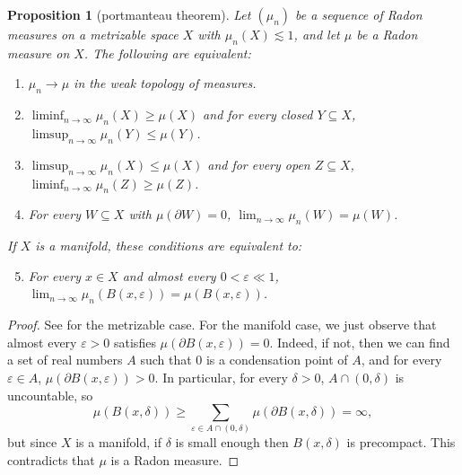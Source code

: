 \documentclass[reqno,11pt]{amsart}
\newtheorem{proposition}[theorem]{Proposition}
\theoremstyle{definition}
\numberwithin{equation}{section}
\begin{document}
\begin{proposition}[portmanteau theorem]
	Let $(\mu_n)$ be a sequence of Radon measures on a metrizable space $X$ with $\mu_n(X) \lesssim 1$, and let $\mu$ be a Radon measure on $X$. The following are equivalent:
\begin{enumerate}
	\item $\mu_n \to \mu$ in the weak topology of measures.
	\item $\liminf_{n \to \infty} \mu_n(X) \geq \mu(X)$ and for every closed $Y \subseteq X$, $\limsup_{n \to \infty} \mu_n(Y) \leq \mu(Y)$.
	\item $\limsup_{n \to \infty} \mu_n(X) \leq \mu(X)$ and for every open $Z \subseteq X$, $\liminf_{n \to \infty} \mu_n(Z) \geq \mu(Z)$.
	\item For every $W \subseteq X$ with $\mu(\partial W) = 0$, $\lim_{n \to \infty} \mu_n(W) = \mu(W)$.
\end{enumerate}
	If $X$ is a manifold, these conditions are equivalent to:
\begin{enumerate}
	\setcounter{enumi}{4}
	\item For every $x \in X$ and almost every $0 < \varepsilon \ll 1$, $\lim_{n \to \infty} \mu_n(B(x, \varepsilon)) = \mu(B(x, \varepsilon))$.
\end{enumerate}
\end{proposition}
\begin{proof}
	See \cite[Theorem 13.16]{klenke2013probability} for the metrizable case.
	For the manifold case, we just observe that almost every $\varepsilon > 0$ satisfies $\mu(\partial B(x, \varepsilon)) = 0$. Indeed, if not, then we can find a set of real numbers $A$ such that $0$ is a condensation point of $A$, and for every $\varepsilon \in A$, $\mu(\partial B(x, \varepsilon)) > 0$.
	In particular, for every $\delta > 0$, $A \cap (0, \delta)$ is uncountable, so
	$$\mu(B(x, \delta)) \geq \sum_{\varepsilon \in A \cap (0, \delta)} \mu(\partial B(x, \delta)) = \infty,$$
	but since $X$ is a manifold, if $\delta$ is small enough then $B(x, \delta)$ is precompact.
	This contradicts that $\mu$ is a Radon measure.
\end{proof}
\end{document}
